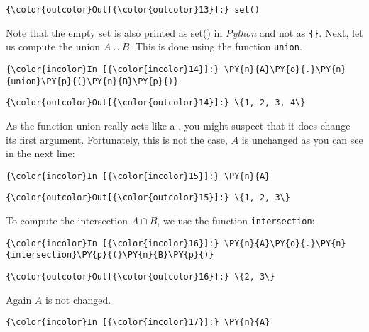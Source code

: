 \begin{Verbatim}[commandchars=\\\{\}]
{\color{outcolor}Out[{\color{outcolor}13}]:} set()
\end{Verbatim}
Note that the empty set is also printed as set() in \textsl{Python} and not as \texttt{\{\}}.
Next, let us compute the union \(A \cup B\). This is done using the
function \texttt{union}.

\begin{Verbatim}[commandchars=\\\{\}]
{\color{incolor}In [{\color{incolor}14}]:} \PY{n}{A}\PY{o}{.}\PY{n}{union}\PY{p}{(}\PY{n}{B}\PY{p}{)}
\end{Verbatim}


\begin{Verbatim}[commandchars=\\\{\}]
{\color{outcolor}Out[{\color{outcolor}14}]:} \{1, 2, 3, 4\}
\end{Verbatim}
            
As the function union really acts like a , you might
suspect that it does change its first argument. Fortunately, this is not
the case, \(A\) is unchanged as you can see in the next line:

\begin{Verbatim}[commandchars=\\\{\}]
{\color{incolor}In [{\color{incolor}15}]:} \PY{n}{A}
\end{Verbatim}

\begin{Verbatim}[commandchars=\\\{\}]
{\color{outcolor}Out[{\color{outcolor}15}]:} \{1, 2, 3\}
\end{Verbatim}            
To compute the intersection \(A \cap B\), we use the function \texttt{intersection}:

\begin{Verbatim}[commandchars=\\\{\}]
{\color{incolor}In [{\color{incolor}16}]:} \PY{n}{A}\PY{o}{.}\PY{n}{intersection}\PY{p}{(}\PY{n}{B}\PY{p}{)}
\end{Verbatim}

\begin{Verbatim}[commandchars=\\\{\}]
{\color{outcolor}Out[{\color{outcolor}16}]:} \{2, 3\}
\end{Verbatim}       
Again \(A\) is not changed.

\begin{Verbatim}[commandchars=\\\{\}]
{\color{incolor}In [{\color{incolor}17}]:} \PY{n}{A}
\end{Verbatim}

